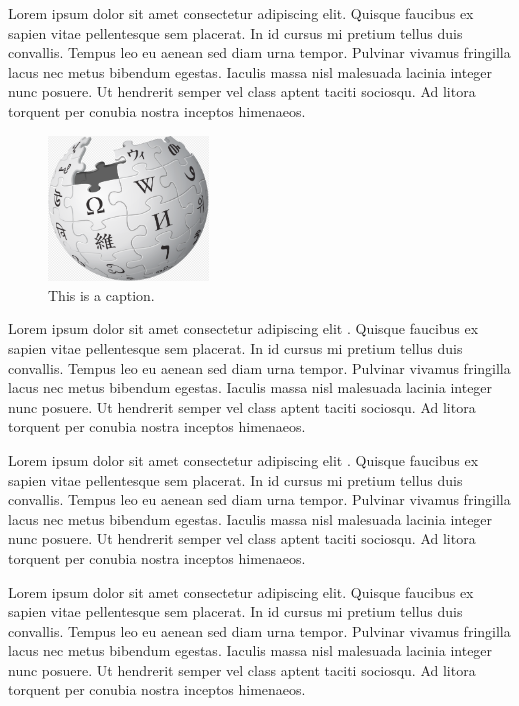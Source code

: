 \documentclass[12pt]{article}
\begin{document}
Lorem ipsum dolor sit amet consectetur adipiscing elit. Quisque faucibus ex sapien vitae pellentesque sem placerat. In id cursus mi pretium tellus duis convallis. Tempus leo eu aenean sed diam urna tempor. Pulvinar vivamus fringilla lacus nec metus bibendum egestas. Iaculis massa nisl malesuada lacinia integer nunc posuere. Ut hendrerit semper vel class aptent taciti sociosqu. Ad litora torquent per conubia nostra inceptos himenaeos.

\begin{figure}
    \centering
    \includegraphics[width=0.38\textwidth]{wiki.png}
    \caption{This is a caption.}
    \label{fig:hypothesis}
\end{figure}

Lorem ipsum dolor sit amet consectetur adipiscing elit \cite{einstein}. Quisque faucibus ex sapien vitae pellentesque sem placerat. In id cursus mi pretium tellus duis convallis. Tempus leo eu aenean sed diam urna tempor. Pulvinar vivamus fringilla lacus nec metus bibendum egestas. Iaculis massa nisl malesuada lacinia integer nunc posuere. Ut hendrerit semper vel class aptent taciti sociosqu. Ad litora torquent per conubia nostra inceptos himenaeos.

Lorem ipsum dolor sit amet consectetur adipiscing elit \cite{dirac}. Quisque faucibus ex sapien vitae pellentesque sem placerat. In id cursus mi pretium tellus duis convallis. Tempus leo eu aenean sed diam urna tempor. Pulvinar vivamus fringilla lacus nec metus bibendum egestas. Iaculis massa nisl malesuada lacinia integer nunc posuere. Ut hendrerit semper vel class aptent taciti sociosqu. Ad litora torquent per conubia nostra inceptos himenaeos.

Lorem ipsum dolor sit amet consectetur adipiscing elit. Quisque faucibus ex sapien vitae pellentesque sem placerat. In id cursus mi pretium tellus duis convallis. Tempus leo eu aenean sed diam urna tempor. Pulvinar vivamus fringilla lacus nec metus bibendum egestas. Iaculis massa nisl malesuada lacinia integer nunc posuere. Ut hendrerit semper vel class aptent taciti sociosqu. Ad litora torquent per conubia nostra inceptos himenaeos.
\end{document}
